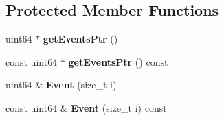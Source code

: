 \subsection*{Protected Member Functions}
\begin{DoxyCompactItemize}
\item 
\mbox{\label{classBasicCounterState_aaa00ab8b84d77b0091b38c42eb6d448b}} 
uint64 $\ast$ {\bfseries get\+Events\+Ptr} ()
\item 
\mbox{\label{classBasicCounterState_a14ace0929b4d685c63ba48ce2d51fc9b}} 
const uint64 $\ast$ {\bfseries get\+Events\+Ptr} () const
\item 
\mbox{\label{classBasicCounterState_a936c4900bec426c8d7a4fc4e15c72ca2}} 
uint64 \& {\bfseries Event} (size\+\_\+t i)
\item 
\mbox{\label{classBasicCounterState_a8a059a0c3d881572ff4e9e6bd2dafc9b}} 
const uint64 \& {\bfseries Event} (size\+\_\+t i) const
\end{DoxyCompactItemize}
